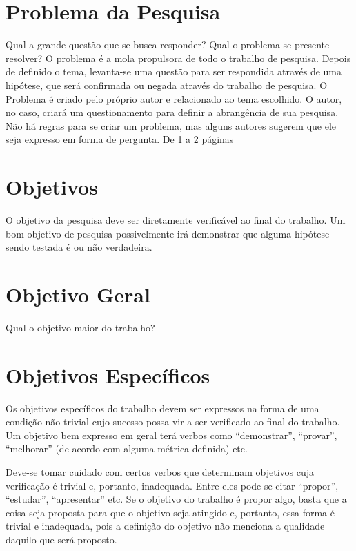 \documentclass[
	12pt,				    %
	openright,			    %
	oneside,			    %
	a4paper,			    %
    sumario=tradicional,    %
	english,			    %
	brazil,				    %
	]{abntex2}
\begin{document}



\section{Problema da Pesquisa}\label{sec:ProbPesq}

Qual a grande questão que se busca responder? Qual o problema se presente resolver? 
O problema é a mola propulsora de todo o trabalho de pesquisa. Depois de definido o tema, levanta-se uma questão para ser respondida através de uma hipótese, que será confirmada ou negada através do trabalho de pesquisa. O Problema é criado pelo próprio autor e relacionado ao tema escolhido. O autor, no caso, criará um questionamento para definir a abrangência de sua pesquisa. Não há regras para se criar um problema, mas alguns autores sugerem que ele seja expresso em forma de pergunta.
De 1 a 2 páginas

\section{Objetivos}\label{sec:objetivos}

O objetivo da pesquisa deve ser diretamente verificável ao final do trabalho. Um bom objetivo de pesquisa possivelmente irá demonstrar que alguma hipótese sendo testada é ou não verdadeira.
\section{Objetivo Geral}\label{sec:ObjGeral}

Qual o objetivo maior do trabalho?

\section{Objetivos Específicos}\label{sec:ObjEspec}

Os objetivos específicos do trabalho devem ser expressos na forma de uma condição não trivial cujo sucesso possa vir a ser verificado ao final do trabalho. Um objetivo bem expresso em geral terá verbos como “demonstrar”, “provar”, “melhorar” (de acordo com alguma métrica definida) etc.

Deve-se tomar cuidado com certos verbos que determinam objetivos cuja verificação é trivial e, portanto, inadequada. Entre eles pode-se citar “propor”, “estudar”, “apresentar” etc. Se o objetivo do trabalho é propor algo, basta que a coisa seja proposta para que o objetivo seja atingido e, portanto, essa forma é trivial e inadequada, pois a definição do objetivo não menciona a qualidade daquilo que será proposto.
\end{document}
